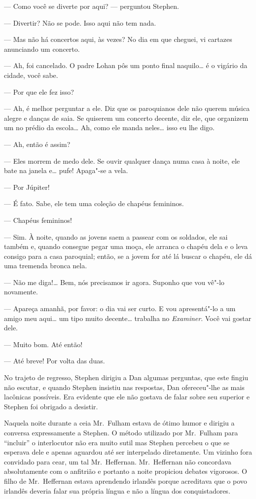 --- Como você se diverte por aqui? --- perguntou Stephen.

--- Divertir?  Não se pode.  Isso aqui não tem nada.

--- Mas não há concertos aqui, às vezes?  No dia em que cheguei,
vi cartazes anunciando um concerto.

--- Ah, foi cancelado.  O padre Lohan pôs um ponto final
naquilo\ldots{} é o vigário da cidade, você sabe.

--- Por que ele fez isso?

--- Ah, é melhor perguntar a ele.  Diz que os paroquianos dele
não querem música alegre e danças de saia.  Se quiserem um concerto
decente, diz ele, que organizem um no prédio da escola\ldots{}  Ah, como ele
manda neles\ldots{} isso eu lhe digo.

--- Ah, então é assim?

--- Eles morrem de medo dele.  Se ouvir qualquer dança numa casa
à noite, ele bate na janela e\ldots{} pufe!  Apaga"-se a vela.

--- Por Júpiter!

--- É fato.  Sabe, ele tem uma coleção de chapéus femininos.

--- Chapéus femininos!

--- Sim.  À noite, quando as jovens saem a passear com os
soldados, ele sai também e, quando consegue pegar uma moça, ele arranca
o chapéu dela e o leva consigo para a casa paroquial; então, se a jovem
for até lá buscar o chapéu, ele dá uma tremenda bronca nela.

--- Não me diga!\ldots{}  Bem, nós precisamos ir agora.  Suponho que
vou vê"-lo novamente.

--- Apareça amanhã, por favor: o dia vai ser curto.  E vou
apresentá"-lo a um amigo meu aqui\ldots{} um tipo muito decente\ldots{} trabalha
no \textit{Examiner}.  Você vai gostar dele.

--- Muito bom.  Até então!		

--- Até breve!  Por volta das duas.

No trajeto de regresso, Stephen dirigiu a Dan algumas perguntas, que
este fingiu não escutar, e quando Stephen insistiu nas respostas, Dan
ofereceu"-lhe as mais lacônicas possíveis.  Era evidente que ele não
gostava de falar sobre seu superior e Stephen foi obrigado a desistir.

Naquela noite durante a ceia Mr.~Fulham estava de ótimo humor e
dirigiu a conversa expressamente a Stephen.  O método utilizado por 
Mr.~Fulham para “incluir” o interlocutor não era muito sutil mas Stephen
percebeu o que se esperava dele e apenas aguardou até ser interpelado
diretamente.  Um vizinho fora convidado para cear, um tal 
Mr.~Heffernan.  Mr.~Heffernan não concordava absolutamente com o anfitrião
e portanto a noite propiciou debates vigorosos.  O filho de 
Mr.~Heffernan estava aprendendo irlandês porque acreditava que o povo
irlandês deveria falar sua própria língua e não a língua dos
conquistadores.

